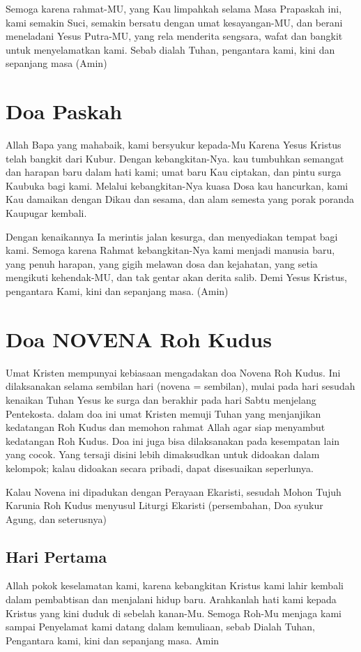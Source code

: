 Semoga karena rahmat-MU, yang Kau limpahkah selama Masa Prapaskah ini,
kami semakin Suci, semakin bersatu dengan umat kesayangan-MU, dan
berani meneladani Yesus Putra-MU, yang rela menderita sengsara, wafat
dan bangkit untuk menyelamatkan kami. Sebab dialah Tuhan, pengantara
kami, kini dan sepanjang masa (Amin)

\section[Doa Paskah]{Doa Paskah}
Allah Bapa yang mahabaik, kami bersyukur kepada-Mu Karena Yesus Kristus
telah bangkit dari Kubur. Dengan kebangkitan-Nya. kau tumbuhkan
semangat dan harapan baru dalam hati kami; umat baru Kau ciptakan, dan
pintu surga Kaubuka bagi kami. Melalui kebangkitan-Nya kuasa Dosa kau
hancurkan, kami Kau damaikan dengan Dikau dan sesama, dan alam semesta
yang porak poranda Kaupugar kembali.

Dengan kenaikannya Ia merintis jalan kesurga, dan menyediakan tempat
bagi kami. Semoga karena Rahmat kebangkitan-Nya kami menjadi manusia
baru, yang penuh harapan, yang gigih melawan dosa dan kejahatan, yang
setia mengikuti kehendak-MU, dan tak gentar akan derita salib. Demi
Yesus Kristus, pengantara Kami, kini dan sepanjang masa. (Amin)
\normalsize

\section[Doa NOVENA Roh Kudus]{Doa NOVENA Roh Kudus}
Umat Kristen mempunyai kebiasaan mengadakan doa Novena Roh Kudus. Ini
dilaksanakan selama sembilan hari (novena = sembilan), mulai pada hari
sesudah kenaikan Tuhan Yesus ke surga dan berakhir pada hari Sabtu
menjelang Pentekosta. dalam doa ini umat Kristen memuji Tuhan yang
menjanjikan kedatangan Roh Kudus dan memohon rahmat Allah agar siap
menyambut kedatangan Roh Kudus. Doa ini juga bisa dilaksanakan pada
kesempatan lain yang cocok. Yang tersaji disini lebih dimaksudkan untuk
didoakan dalam kelompok; kalau didoakan secara pribadi, dapat
disesuaikan seperlunya.

Kalau Novena ini dipadukan dengan Perayaan Ekaristi, sesudah Mohon Tujuh
Karunia Roh Kudus menyusul Liturgi Ekaristi (persembahan, Doa syukur
Agung, dan seterusnya)

\subsection*{Hari Pertama}
Allah pokok keselamatan kami, karena kebangkitan Kristus kami lahir
kembali dalam pembabtisan dan menjalani hidup baru. Arahkanlah hati
kami kepada Kristus yang kini duduk di sebelah kanan-Mu. Semoga Roh-Mu
menjaga kami sampai Penyelamat kami datang dalam kemuliaan, sebab
Dialah Tuhan, Pengantara kami, kini dan sepanjang masa. Amin

